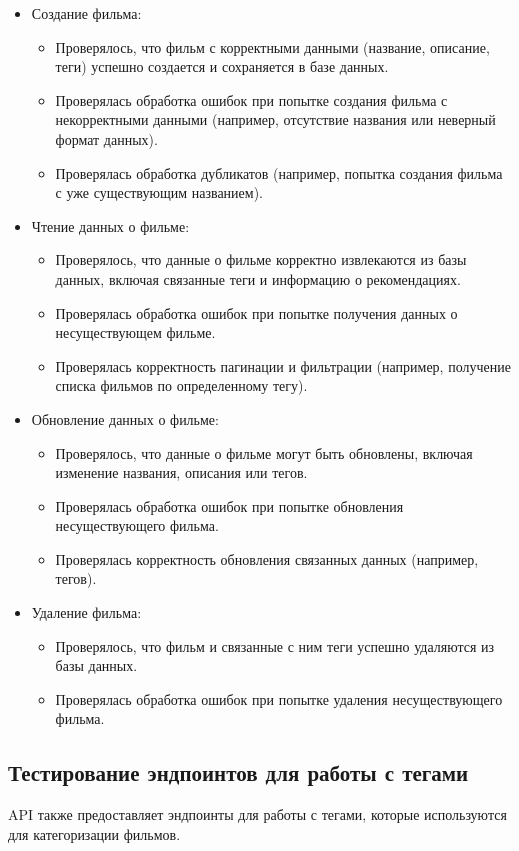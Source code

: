 \begin{itemize}
    \item Создание фильма:
    \begin{itemize}
        \item Проверялось, что фильм с корректными данными (название, описание, теги) успешно создается и сохраняется в базе данных.
        \item Проверялась обработка ошибок при попытке создания фильма с некорректными данными (например, отсутствие названия или неверный формат данных).
        \item Проверялась обработка дубликатов (например, попытка создания фильма с уже существующим названием).
    \end{itemize}
    \item Чтение данных о фильме:
    \begin{itemize}
        \item Проверялось, что данные о фильме корректно извлекаются из базы данных, включая связанные теги и информацию о рекомендациях.
        \item Проверялась обработка ошибок при попытке получения данных о несуществующем фильме.
        \item Проверялась корректность пагинации и фильтрации (например, получение списка фильмов по определенному тегу).
    \end{itemize}
    \item Обновление данных о фильме:
    \begin{itemize}
        \item Проверялось, что данные о фильме могут быть обновлены, включая изменение названия, описания или тегов.
        \item Проверялась обработка ошибок при попытке обновления несуществующего фильма.
        \item Проверялась корректность обновления связанных данных (например, тегов).
    \end{itemize}
    \item Удаление фильма:
    \begin{itemize}
        \item Проверялось, что фильм и связанные с ним теги успешно удаляются из базы данных.
        \item Проверялась обработка ошибок при попытке удаления несуществующего фильма.
    \end{itemize}
\end{itemize}

\subsection*{Тестирование эндпоинтов для работы с тегами}
API также предоставляет эндпоинты для работы с тегами, которые используются для категоризации фильмов.

